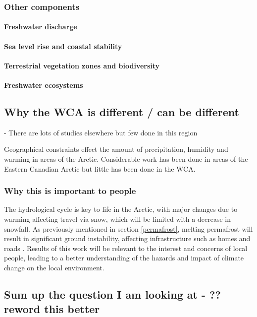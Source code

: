 \documentclass[12pt, oneside]{article}
\begin{document}
\subsubsection{Other components}
\paragraph{Freshwater discharge}
\paragraph{Sea level rise and coastal stability}
\paragraph{ Terrestrial vegetation zones and biodiversity}
\paragraph{Freshwater ecosystems}



\subsection{Why the WCA is different / can be different}
{\color{blue}- There are lots of studies elsewhere but few done in this region }

Geographical constraints effect the amount of precipitation, humidity and warming in areas of the Arctic. Considerable work has been done in areas of the Eastern Canadian Arctic but little has been done in the WCA. 


\subsubsection{Why this is important to people}
The hydrological cycle is key to life in the Arctic, with major changes due to warming affecting travel via snow, which will be limited with a decrease in snowfall. As previously mentioned in section \ref{permafrost}, melting permafrost will result in significant ground instability, affecting infrastructure such as homes and roads \cite{Hjort2018}. Results of this work will be relevant to the interest and concerns of local people, leading to a better understanding of the hazards and impact of climate change on the local environment.



\subsection{Sum up the question I am looking at - ?? reword this better}
\end{document}
